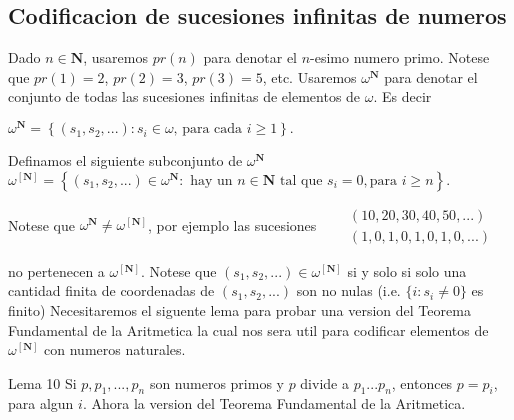 \subsection{Codificacion de sucesiones infinitas de numeros}

Dado \(n\in \mathbf{N}\), usaremos \(pr(n)\) para denotar el \(n\)-esimo numero primo. Notese que \(pr(1)=2\), \(pr(2)=3\), \(pr(3)=5\), etc. Usaremos \(\omega ^{ \mathbf{N}}\) para denotar el conjunto de todas las sucesiones infinitas de elementos de \(\omega .\) Es decir

\(\displaystyle \omega ^{\mathbf{N}}=\left\{ (s_{1},s_{2},...):s_{i}\in \omega \text{, para cada }i\geq 1\right\} \text{.} \)

Definamos el siguiente subconjunto de \(\omega ^{\mathbf{N}}\)
\(\displaystyle \omega ^{\left[ \mathbf{N}\right] }=\left\{ (s_{1},s_{2},...)\in \omega ^{ \mathbf{N}}:\text{ hay un }n\in \mathbf{N}\text{ tal que }s_{i}=0,\text{para }i\geq n\right\} \text{.} \)

Notese que \(\omega ^{\mathbf{N}}\neq \omega ^{\left[ \mathbf{N}\right] }\), por ejemplo las sucesiones
\(\displaystyle \begin{array}{rcl} & & (10,20,30,40,50,...) \\ & & (1,0,1,0,1,0,1,0,...) \end{array} \)

no pertenecen a \(\omega ^{\left[ \mathbf{N}\right] }\). Notese que \( (s_{1},s_{2},...)\in \omega ^{\left[ \mathbf{N}\right] }\) si y solo si solo una cantidad finita de coordenadas de \((s_{1},s_{2},...)\) son no nulas (i.e. \(\{i:s_{i}\neq 0\}\) es finito)
Necesitaremos el siguente lema para probar una version del Teorema Fundamental de la Aritmetica la cual nos sera util para codificar elementos de \(\omega ^{\left[ \mathbf{N}\right] }\) con numeros naturales.

Lema 10 Si \(p,p_{1},...,p_{n}\) son numeros primos y \(p\) divide a \(p_{1}...p_{n}\), entonces \(p=p_{i}\), para algun \(i\).
Ahora la version del Teorema Fundamental de la Aritmetica.

